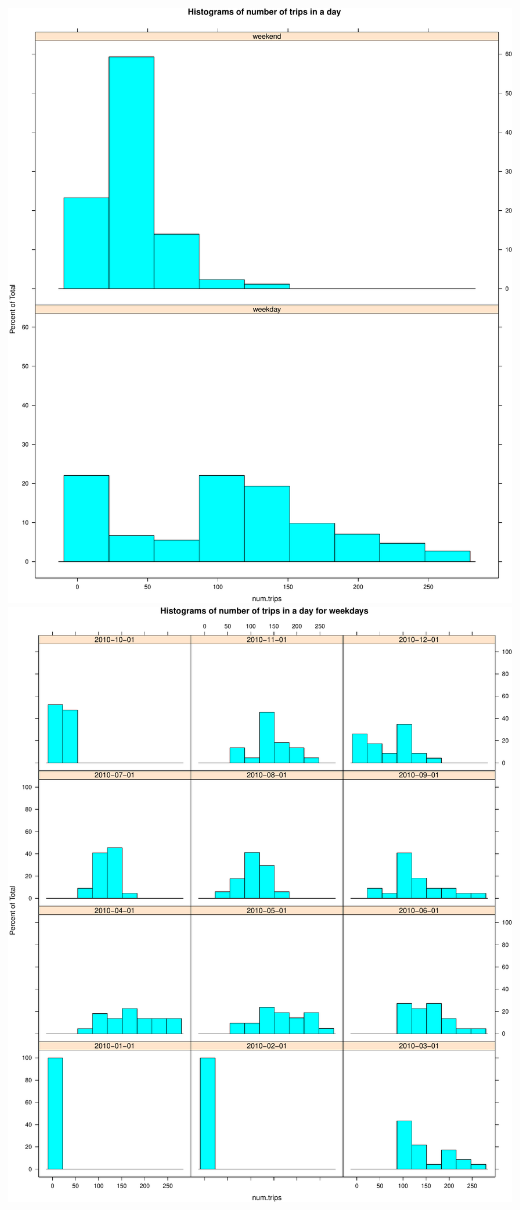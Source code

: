 \documentclass[]{article}
\begin{document}
\includegraphics{velopassBirdsEye_files/figure-latex/histtripsdistbn-1.pdf}
\includegraphics{velopassBirdsEye_files/figure-latex/histtripsdistbn-2.pdf}
\end{document}
